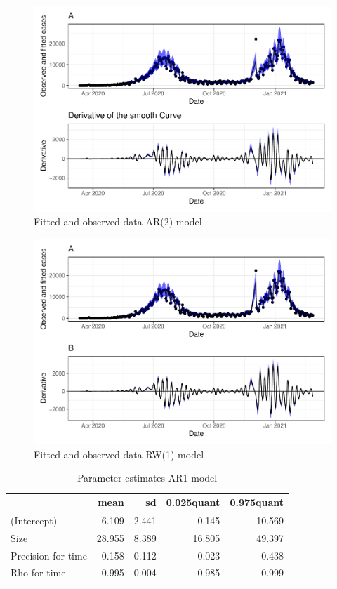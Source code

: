 \documentclass[10pt,letterpaper]{article}
\begin{document}
\begin{figure}[H]
\includegraphics[width=0.99\linewidth]{COVIDincidenceSA_files/figure-latex/unnamed-chunk-13-1} \caption{Fitted and observed data AR(2) model}\label{fig:unnamed-chunk-13}
\end{figure}

\begin{figure}[H]
\includegraphics[width=0.99\linewidth]{COVIDincidenceSA_files/figure-latex/unnamed-chunk-14-1} \caption{Fitted and observed data RW(1) model}\label{fig:unnamed-chunk-14}
\end{figure}

\begin{table}[!h]
	
	\caption{\label{tab:unnamed-chunk-11}Parameter estimates AR1 model}
	\centering
	\begin{tabular}[t]{l|r|r|r|r}
		\hline
		& mean & sd & 0.025quant & 0.975quant\\
		\hline
		(Intercept) & 6.109 & 2.441 & 0.145 & 10.569\\
		\hline
		Size & 28.955 & 8.389 & 16.805 & 49.397\\
		\hline
		Precision for time & 0.158 & 0.112 & 0.023 & 0.438\\
		\hline
		Rho for time & 0.995 & 0.004 & 0.985 & 0.999\\
		\hline
	\end{tabular}
\end{table}
\end{document}
